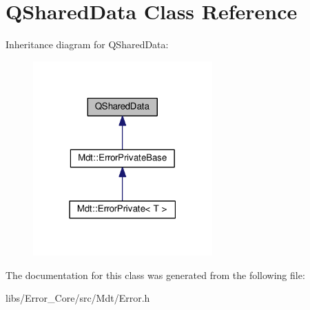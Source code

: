 \hypertarget{class_q_shared_data}{}\section{Q\+Shared\+Data Class Reference}
\label{class_q_shared_data}


Inheritance diagram for Q\+Shared\+Data\+:\nopagebreak
\begin{figure}[H]
\begin{center}
\leavevmode
\includegraphics[width=195pt]{class_q_shared_data__inherit__graph}
\end{center}
\end{figure}


The documentation for this class was generated from the following file\+:\begin{DoxyCompactItemize}
\item 
libs/\+Error\+\_\+\+Core/src/\+Mdt/Error.\+h\end{DoxyCompactItemize}
